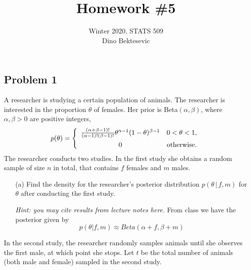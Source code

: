 \documentclass{article}
\date{{}}
\newcommand{\1}{\mathbf{1}}
\begin{document}
\title{Homework \#5}
\author{\normalsize{Winter 2020, STATS 509}\\
\normalsize{Dino Bektesevic}}
\maketitle


\subsection*{Problem 1}
A researcher is studying a certain population of animals. The researcher is interested in the proportion $\theta$ of females. Her prior is Beta$(\alpha, \beta)$, where $\alpha, \beta > 0$ are positive integers, 
$$ p(\theta) = \left\{ \begin{array}{cc}
    \frac{(\alpha + \beta - 1)!}{(\alpha -1)! (\beta-1)!} \theta^{\alpha-1}(1-\theta)^{\beta-1} & 0< \theta < 1,\\[6pt]
    0 & \hbox{otherwise}.
\end{array}
\right.
$$
The researcher conducts two studies. In the first study she obtains a random sample of size $n$ in total, that contains $f$ females and $m$ males. 
\begin{enumerate}
    \item[(a)] Find the density for the researcher's posterior distribution $p(\theta \,|\, f,m)$ for $\theta$ after conducting the first study.\par
    {\it Hint: you may cite results from lecture notes here.}
    From class we have the posterior given by
    $$p(\theta | f,m) \approx Beta(\alpha+f, \beta+m)$$
\end{enumerate}
\noindent In the second study, the researcher randomly samples animals until she observes the first male, at which point she stops. Let $t$ be the total number of animals (both male and female) sampled in the second study.
\end{document}
